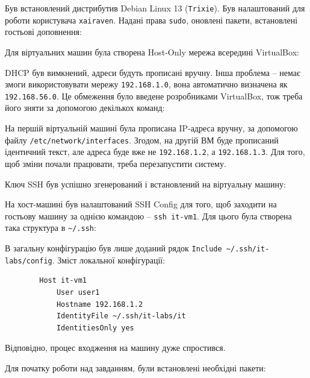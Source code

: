 \documentclass[14pt, a4paper]{extreport}
\begin{document}
	Був встановлений дистрибутив Debian Linux 13 (\texttt{Trixie}). Був налаштований для роботи користувача \texttt{xairaven}. Надані права \texttt{sudo}, оновлені пакети, встановлені гостьові доповнення:
	
	
	Для віртуальних машин була створена Host-Only мережа всередині VirtualBox:
	
	
	DHCP був вимкнений, адреси будуть прописані вручну. Інша проблема -- немає змоги використовувати мережу \texttt{192.168.1.0}, вона автоматично визначена як \texttt{192.168.56.0}. Це обмеження було введене розробниками VirtualBox, тож треба його зняти за допомогою декількох команд:
	
	
	На першій віртуальній машині була прописана IP-адреса вручну, за допомогою файлу \texttt{/etc/network/interfaces}. Згодом, на другій ВМ буде прописаний ідентичний текст, але адреса буде вже не \texttt{192.168.1.2}, а \texttt{192.168.1.3}. Для того, щоб зміни почали працювати, треба перезапустити систему.
	
	
	Ключ SSH був успішно згенерований і встановлений на віртуальну машину:
	
	
	На хост-машині був налаштований SSH Config для того, щоб заходити на гостьову машину за однією командою -- \texttt{ssh it-vm1}. Для цього була створена така структура в \texttt{\textasciitilde/.ssh}:
	
	
	В загальну конфігурацію був лише доданий рядок \texttt{Include \textasciitilde/.ssh/it-labs/config}. Зміст локальної конфігурації:
	
	\begin{verbatim}
		Host it-vm1
			User user1
			Hostname 192.168.1.2
			IdentityFile ~/.ssh/it-labs/it
			IdentitiesOnly yes
	\end{verbatim}
	
	Відповідно, процес входження на машину дуже спростився.
	
	
	Для початку роботи над завданням, були встановлені необхідні пакети:
	
	
\end{document}
